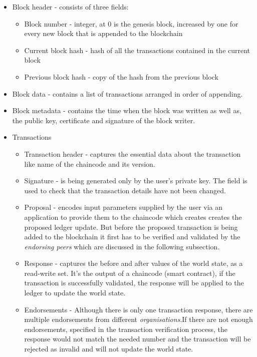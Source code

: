\documentclass[a4paper,11pt]{report}
\begin{document}
\begin{itemize}
\item Block header - consists of three fields:
	\begin{itemize}
	\item Block number - integer, at 0 is the genesis block, increased by one for every new block that is appended to the blockchain
	\item Current block hash - hash of all the transactions contained in the current block
	\item Previous block hash - copy of the hash from the previous block
	\end{itemize}	 
\item Block data - contains a list of transactions arranged in order of appending.
\item Block metadata - contains the time when the block was written as well as, the public key, certificate and signature of the block writer. 
\item Transactions
	\begin{itemize}
	\item Transaction header - captures the essential data about the transaction like name of the chaincode and its version. 
	\item Signature - is being generated only by the user’s private key. The field is used to check that the transaction details have not been changed.
	\item Proposal - encodes input parameters supplied by the user via an application to provide them to the chaincode which creates creates the proposed ledger update. But before the proposed transaction is being added to the blockchain it first has to be verified and validated by the \textit{endorsing peers} which are discussed in the following subsection.
	\item Response - captures the before and after values of the world state, as a read-write set. It’s the output of a chaincode (smart contract), if the transaction is successfully validated, the response will be applied to the ledger to update the world state. 
	\item Endorsements - Although there is only one transaction response, there are multiple endorsements from different \textit{organisations}.If there are not enough endorsements, specified in the transaction verification process, the response would not match the needed number and the transaction will be rejected as invalid and will not update the world state.  
	\end{itemize}
\end{itemize}
\end{document}
